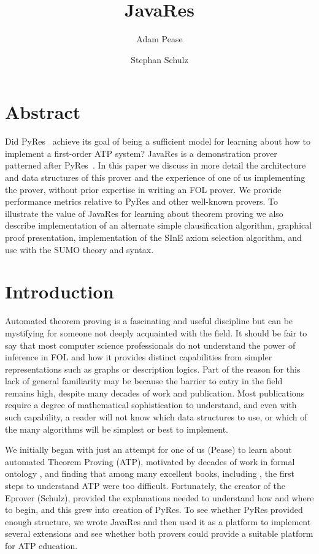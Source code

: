 \documentclass{llncs}
\title{JavaRes}
\author{Adam Pease\inst{2}
        \and Stephan Schulz\inst{1}
  }
\institute{
  Articulate Software, USA,
  \email{\tt apease@articulatesoftware.com}
  \and
  DHBW Stuttgart, Germany,
  \email{\tt schulz@eprover.org}
}
\begin{document}
\maketitle

\section{Abstract}
Did PyRes~\cite{SP:IJCAR-2020} achieve its goal of being a sufficient
model for learning about how to implement a first-order ATP system?
JavaRes is a demonstration prover patterned after
PyRes~\cite{SP:IJCAR-2020}.  In this paper we discuss in more detail
the architecture and data structures of this prover and the experience
of one of us implementing the prover, without prior expertise
in writing an FOL prover.  We provide performance metrics relative to
PyRes and other well-known provers.  To illustrate the value of
JavaRes for learning about theorem proving we also describe
implementation of an alternate simple clausification algorithm,
graphical proof presentation, implementation of the SInE axiom
selection algorithm, and use with the SUMO theory and syntax.


\section{Introduction}

Automated theorem proving is a fascinating and useful discipline but
can be mystifying for someone not deeply acquainted with the field.
It should be fair to say that most computer science professionals do
not understand the power of inference in FOL and how it provides
distinct capabilities from simpler representations such as graphs or
description logics.  Part of the reason for this lack of general
familiarity may be because the barrier to entry in the field remains
high, despite many decades of work and publication.  Most publications
require a degree of mathematical sophistication to understand, and
even with such capability, a reader will not know which data
structures to use, or which of the many algorithms will be simplest or best to
implement.

We initially began with just an attempt for one of us (Pease) to learn
about automated Theorem Proving (ATP), motivated by decades of work in formal ontology \cite{np01,p11},
and finding that among many excellent books, including \cite{Harrison:HPL-2009},
the first steps to understand ATP were too difficult.  Fortunately, the
creator of the Eprover (Schulz), provided the explanations needed to
understand how and where to begin, and this grew into creation of
PyRes.  To see whether PyRes provided enough structure, we wrote
JavaRes and then used it as a platform to implement several extensions
and see whether both provers could provide a suitable platform for ATP
education.
\end{document}
